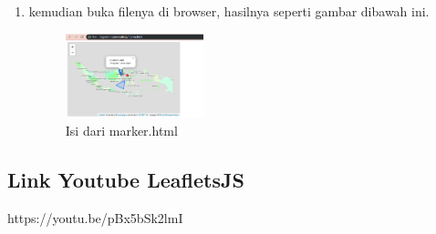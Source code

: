 \begin{enumerate}
\item kemudian buka filenya di browser, hasilnya seperti gambar dibawah ini.
\hfill\break
\begin{figure}[H]
\includegraphics[width=4cm]{figures/tugas5/1174053/5.png}
\centering
\caption{Isi dari marker.html}
\end{figure}

\end{enumerate}

\subsection{Link Youtube LeafletsJS}
https://youtu.be/pBx5bSk2lmI